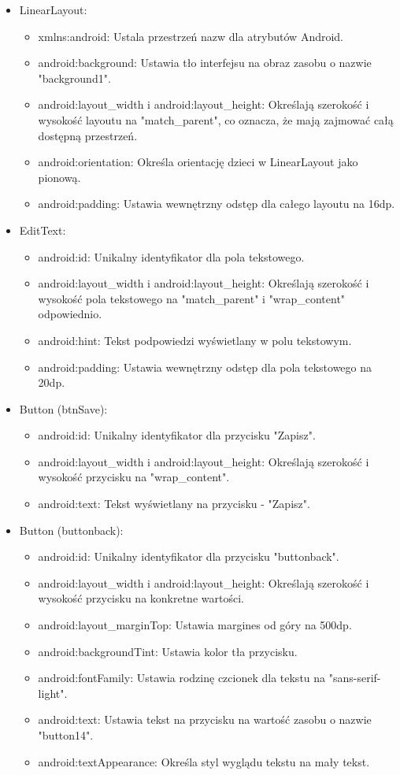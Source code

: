 \begin{itemize}
    \item LinearLayout:
    \begin{itemize}
        \item xmlns:android: Ustala przestrzeń nazw dla atrybutów Android.
        \item android:background: Ustawia tło interfejsu na obraz zasobu o nazwie "background1".
        \item android:layout\_width i android:layout\_height: Określają szerokość i wysokość layoutu na "match\_parent", co oznacza, że mają zajmować całą dostępną przestrzeń.
        \item android:orientation: Określa orientację dzieci w LinearLayout jako pionową.
        \item android:padding: Ustawia wewnętrzny odstęp dla całego layoutu na 16dp.
    \end{itemize}
    \item EditText:
    \begin{itemize}
        \item android:id: Unikalny identyfikator dla pola tekstowego.
        \item android:layout\_width i android:layout\_height: Określają szerokość i wysokość pola tekstowego na "match\_parent" i "wrap\_content" odpowiednio.
        \item android:hint: Tekst podpowiedzi wyświetlany w polu tekstowym.
        \item android:padding: Ustawia wewnętrzny odstęp dla pola tekstowego na 20dp.
    \end{itemize}
    \item Button (btnSave):
    \begin{itemize}
        \item android:id: Unikalny identyfikator dla przycisku "Zapisz".
        \item android:layout\_width i android:layout\_height: Określają szerokość i wysokość przycisku na "wrap\_content".
        \item android:text: Tekst wyświetlany na przycisku - "Zapisz".
    \end{itemize}
    \item Button (buttonback):
    \begin{itemize}
        \item android:id: Unikalny identyfikator dla przycisku "buttonback".
        \item android:layout\_width i android:layout\_height: Określają szerokość i wysokość przycisku na konkretne wartości.
        \item android:layout\_marginTop: Ustawia margines od góry na 500dp.
        \item android:backgroundTint: Ustawia kolor tła przycisku.
        \item android:fontFamily: Ustawia rodzinę czcionek dla tekstu na "sans-serif-light".
        \item android:text: Ustawia tekst na przycisku na wartość zasobu o nazwie "button14".
        \item android:textAppearance: Określa styl wyglądu tekstu na mały tekst.
    \end{itemize}
\end{itemize}
